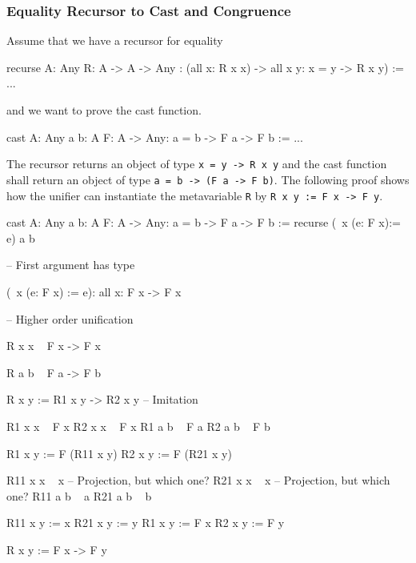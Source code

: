\subsubsection{Equality Recursor to Cast and Congruence}


Assume that we have a recursor for equality

\begin{alba}
    recurse {A: Any} {R: A -> A -> Any}
        : (all x: R x x) -> all x y: x = y -> R x y)
    :=
        ...
\end{alba}

and we want to prove the cast function.

\begin{alba}
    cast {A: Any} {a b: A} {F: A -> Any}: a = b -> F a -> F b
    :=
        ...
\end{alba}

The recursor returns an object of type {\tt x = y -> R x y} and the cast
function shall return an object of type {\tt a = b -> (F a -> F b)}. The
following proof shows how the unifier can instantiate the metavariable {\tt R}
by {\tt R x y := F x -> F y}.

\begin{alba}
    cast {A: Any} {a b: A} {F: A -> Any}: a = b -> F a -> F b
    :=
        recurse (\ x (e: F x):= e) a b

        -- First argument has type

            (\ x (e: F x) := e): all x: F x -> F x

        -- Higher order unification

            R x x       ~       F x -> F x

            R a b       ~       F a -> F b

                R x y := R1 x y -> R2 x y       -- Imitation

                R1 x x      ~       F x
                R2 x x      ~       F x
                R1 a b      ~       F a
                R2 a b      ~       F b

                    R1 x y := F (R11 x y)
                    R2 x y := F (R21 x y)

                    R11 x x     ~   x           -- Projection, but which one?
                    R21 x x     ~   x           -- Projection, but which one?
                    R11 a b     ~   a
                    R21 a b     ~   b

                        R11 x y := x
                        R21 x y := y
                        R1 x y  := F x
                        R2 x y  := F y

                        R  x y := F x -> F y
\end{alba}


